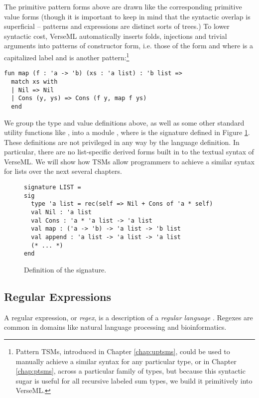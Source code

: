 The primitive pattern forms above are drawn like the corresponding primitive value forms (though it is important to keep in mind that the syntactic overlap is superficial -- patterns and expressions are distinct sorts of trees.) To lower syntactic cost, VerseML automatically inserts folds, injections and trivial arguments into patterns of constructor form, i.e. those of the form  and  where  is a capitalized label and  is another pattern:\footnote{Pattern TSMs, introduced in Chapter \ref{chap:uptsms}, could be used to manually achieve a similar syntax for any particular type, or in Chapter \ref{chap:ptsms}, across a particular family of types, but because this syntactic sugar is useful for all recursive labeled sum types, we build it primitively into VerseML.}
\begin{lstlisting}[numbers=none]
fun map (f : 'a -> 'b) (xs : 'a list) : 'b list => 
  match xs with 
  | Nil => Nil 
  | Cons (y, ys) => Cons (f y, map f ys)
  end
\end{lstlisting}

We group the type and value definitions above, as well as some other standard utility functions like , into a module , where  is the signature defined in Figure \ref{fig:LIST}. These definitions are not privileged in any way by the language definition. In particular, there are no list-specific derived forms built in to the textual syntax of VerseML. We will show how TSMs allow programmers to achieve a similar syntax for lists over the next several chapters.

\begin{figure}
\begin{lstlisting}[numbers=none]
signature LIST = 
sig 
  type 'a list = rec(self => Nil + Cons of 'a * self)
  val Nil : 'a list
  val Cons : 'a * 'a list -> 'a list
  val map : ('a -> 'b) -> 'a list -> 'b list
  val append : 'a list -> 'a list -> 'a list
  (* ... *)
end
\end{lstlisting}
\caption{Definition of the  signature.}
\label{fig:LIST}
\end{figure}

\subsection{Regular Expressions}\label{sec:syntax-examples-regexps}
A regular expression, or \emph{regex}, is a description of a \emph{regular language} \cite{Thompson:1968:PTR:363347.363387}. Regexes are common in domains like natural language processing and bioinformatics.

